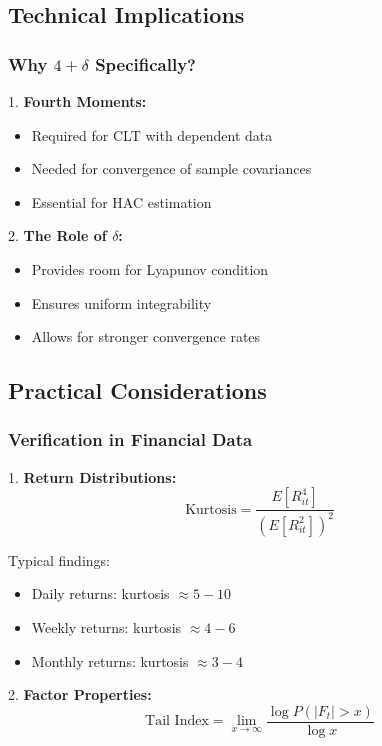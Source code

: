 \documentclass[12pt,article]{memoir}
\begin{document}
\subsection{Technical Implications}

\subsubsection{Why $4+\delta$ Specifically?}

1. \textbf{Fourth Moments:}
   \begin{itemize}
       \item Required for CLT with dependent data
       \item Needed for convergence of sample covariances
       \item Essential for HAC estimation
   \end{itemize}

2. \textbf{The Role of $\delta$:}
   \begin{itemize}
       \item Provides room for Lyapunov condition
       \item Ensures uniform integrability
       \item Allows for stronger convergence rates
   \end{itemize}

\subsection{Practical Considerations}

\subsubsection{Verification in Financial Data}

1. \textbf{Return Distributions:}
\begin{equation}
    \text{Kurtosis} = \frac{E[R_{it}^4]}{(E[R_{it}^2])^2}
\end{equation}

Typical findings:
\begin{itemize}
    \item Daily returns: kurtosis $\approx 5-10$
    \item Weekly returns: kurtosis $\approx 4-6$
    \item Monthly returns: kurtosis $\approx 3-4$
\end{itemize}

2. \textbf{Factor Properties:}
\begin{equation}
    \text{Tail Index} = \lim_{x \to \infty} \frac{\log P(|F_t| > x)}{\log x}
\end{equation}
\end{document}
